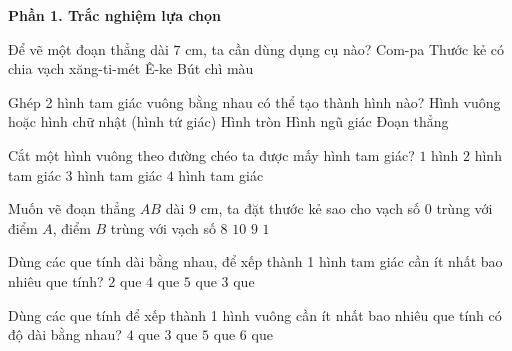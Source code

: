 \textbf{Phần 1. Trắc nghiệm lựa chọn}

\begin{ex} %
Để vẽ một đoạn thẳng dài $7\text{ cm}$, ta cần dùng dụng cụ nào?
\choice
{Com-pa}
{\True Thước kẻ có chia vạch xăng-ti-mét}
{Ê-ke}
{Bút chì màu}
\end{ex}

\begin{ex} %
Ghép 2 hình tam giác vuông bằng nhau có thể tạo thành hình nào?
\choice
{\True Hình vuông hoặc hình chữ nhật (hình tứ giác)}
{Hình tròn}
{Hình ngũ giác}
{Đoạn thẳng}
\end{ex}

\begin{ex} %
Cắt một hình vuông theo đường chéo ta được mấy hình tam giác?
\choice
{$1$ hình}
{\True $2$ hình tam giác}
{$3$ hình tam giác}
{$4$ hình tam giác}
\end{ex}

\begin{ex} %
Muốn vẽ đoạn thẳng $AB$ dài $9\text{ cm}$, ta đặt thước kẻ sao cho vạch số 0 trùng với điểm $A$, điểm $B$ trùng với vạch số
\choice
{$8$}
{$10$}
{\True $9$}
{$1$}
\end{ex}

\begin{ex} %
Dùng các que tính dài bằng nhau, để xếp thành 1 hình tam giác cần ít nhất bao nhiêu que tính?
\choice
{$2$ que}
{$4$ que}
{$5$ que}
{\True $3$ que}
\end{ex}

\begin{ex} %
Dùng các que tính để xếp thành 1 hình vuông cần ít nhất bao nhiêu que tính có độ dài bằng nhau?
\choice
{\True $4$ que}
{$3$ que}
{$5$ que}
{$6$ que}
\end{ex}

